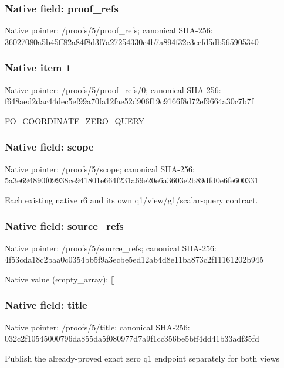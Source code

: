 \documentclass[10pt,a4paper]{article}
\begin{document}
\subsubsection{Native field: proof\_\allowbreak{}refs}
Native pointer: /proofs/5/proof\_\allowbreak{}refs; canonical SHA-256: 36027080a5b45ff82a84f8d3f7a27254330c4b7a894f32c3ecfd5db565905340

\subsubsection{Native item 1}
Native pointer: /proofs/5/proof\_\allowbreak{}refs/0; canonical SHA-256: f648aed2dac44dec5ef99a70fa12fae52d906f19c9166f8d72ef9664a30c7b7f

\begingroup\raggedright\sloppy FO\_\allowbreak{}COORDINATE\_\allowbreak{}ZERO\_\allowbreak{}QUERY\par\endgroup

\subsubsection{Native field: scope}
Native pointer: /proofs/5/scope; canonical SHA-256: 5a3e694890f09938ce941801e664f231a69e20e6a3603e2b89dfd0e6fe600331

\begingroup\raggedright\sloppy Each existing native r6 and its own q1/\allowbreak{}view/\allowbreak{}g1/\allowbreak{}scalar-query contract.\par\endgroup

\subsubsection{Native field: source\_\allowbreak{}refs}
Native pointer: /proofs/5/source\_\allowbreak{}refs; canonical SHA-256: 4f53cda18c2baa0c0354bb5f9a3ecbe5ed12ab4d8e11ba873c2f11161202b945

Native value (empty\_\allowbreak{}array): []

\subsubsection{Native field: title}
Native pointer: /proofs/5/title; canonical SHA-256: 032c2f10545000796da855da5f080977d7a9f1cc356be5bff4dd41b33adf35fd

\begingroup\raggedright\sloppy Publish the already-proved exact zero q1 endpoint separately for both views\par\endgroup
\end{document}
